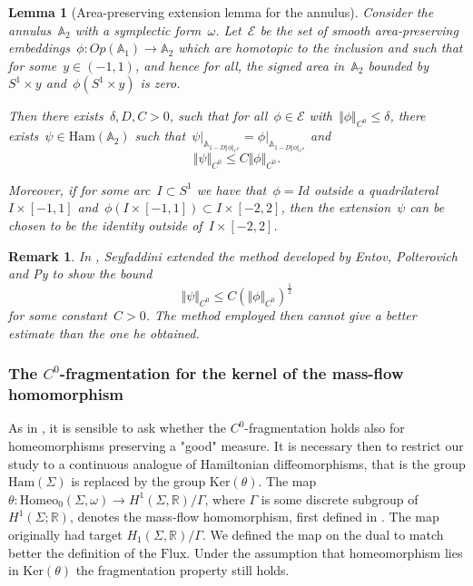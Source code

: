 \documentclass[10pt]{amsart}
\newtheorem{lemma}[prop]{Lemma}
\newtheorem{rk}[prop]{Remark}
\newcommand{\Ham}{\mathrm{Ham}}
\newcommand{\Homeo}{\mathrm{Homeo}}
\newcommand{\Ker}{\mathrm{Ker}}
\newcommand{\Flux}{\mathrm{Flux}}
\begin{document}
\begin{lemma}[Area-preserving extension lemma for the annulus]\label{lem: new version of the extension lemma}
	Consider the annulus~$\mathbb{A}_2$ with a symplectic form~$\omega$. Let~$\mathcal{E}$ be the set of smooth area-preserving embeddings~$\phi: Op(\mathbb{A}_1)\rightarrow \mathbb{A}_2$ which are homotopic to the inclusion and such that for some~$y\in (-1,1)$, and hence for all, the signed area in~$\mathbb{A}_2$ bounded by~$S^1\times y$ and~$\phi(S^1 \times y)$ is zero.
	
	Then there exists~$\delta, D, C>0$, such that for all~$\phi \in \mathcal{E}$ with~$\Vert\phi \Vert_{C^0}\leq \delta$, there exists~$\psi \in \text{Ham}(\mathbb{A}_2)$ such that~$\psi \vert_{\mathbb{A}_{1-D\Vert\phi \Vert_{C^0}}}=\phi\vert_{\mathbb{A}_{1-D\Vert\phi \Vert_{C^0}}}$ and 
	$$\Vert \psi \Vert_{C^0}\leq C \Vert\phi \Vert_{C^0}.$$
	
	Moreover, if for some arc~$I\subset S^1$ we have that~$\phi=Id$ outside a quadrilateral~$I\times[-1,1]$ and~$\phi(I\times [-1,1])\subset I\times [-2,2]$, then the extension~$\psi$ can be chosen to be the identity outside of~$I\times [-2,2]$.
\end{lemma}

\begin{rk}
In \cite{Seyfaddini}, Seyfaddini extended the method developed by Entov, Polterovich and Py to show the bound
$$\Vert \psi \Vert_{C^0}\leq C \left( \Vert \phi \Vert_{C^0}\right) ^{\frac{1}{2}}$$
for some constant~$C>0$. The method employed then cannot give a better estimate than the one he obtained.
\end{rk}


\subsubsection{The $C^0$-fragmentation for the kernel of the mass-flow homomorphism}\label{subsubsec: C^0 frag for homeo}

As in \cite{Fathi}, it is sensible to ask whether the $C^0$-fragmentation holds also for homeomorphisms preserving a "good" measure. It is necessary then to restrict our study to a continuous analogue of Hamiltonian diffeomorphisms, that is the group $\Ham(\Sigma)$ is replaced by the group $\Ker(\theta)$. The map $\theta : \Homeo_0(\Sigma, \omega) \to
H^1(\Sigma,\mathbb R)/\Gamma$, where $\Gamma$ is some discrete subgroup of $H^1(\Sigma;\mathbb R)$, denotes the mass-flow homomorphism, first defined in \cite{Schwartzman}. The map originally had target $H_1(\Sigma,\mathbb R)/\Gamma$. We defined the map on the dual to match better the definition of the $\Flux$. Under the assumption that homeomorphism lies in $\Ker(\theta)$ the fragmentation property still holds.
\end{document}
